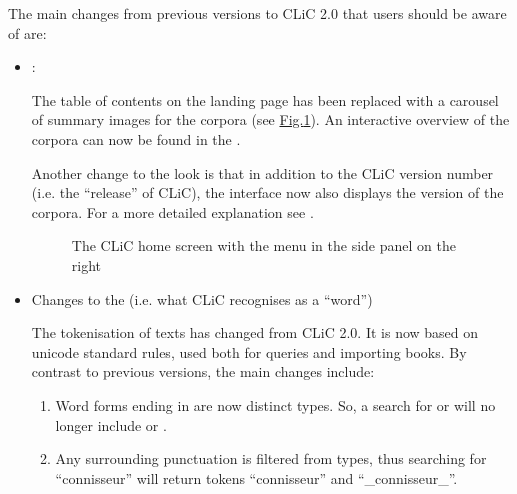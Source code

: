 \documentclass[letterpaper,10pt,english]{sphinxmanual}
\begin{document}
\sphinxAtStartPar
The main changes from previous versions to CLiC 2.0 that users should be
aware of are:
\begin{itemize}
\item {} 
\sphinxAtStartPar
{}:

\sphinxAtStartPar
The table of contents on the landing page has been replaced with a
carousel of summary images for the corpora (see
\hyperref[\detokenize{whatsnew:figure-landing-page-2-0-0-19c}]{Fig.\@ \ref{\detokenize{whatsnew:figure-landing-page-2-0-0-19c}}}). An interactive overview of
the corpora can now be found in the .

\sphinxAtStartPar
Another change to the look is that in addition to the CLiC version
number (i.e. the “release” of CLiC), the interface now also displays
the version of the corpora. For a more detailed explanation see
{\hyperref[\detokenize{cliccorpora:the-clic-corpora}]{}}.

\begin{figure}[htbp]
\centering
\capstart

\noindent{}
\caption{The CLiC home screen with the menu in the side panel on
the right}\label{\detokenize{whatsnew:id2}}\label{\detokenize{whatsnew:figure-landing-page-2-0-0-19c}}\end{figure}

\item {} 
\sphinxAtStartPar
Changes to the  (i.e. what CLiC recognises as a
“word”)

\sphinxAtStartPar
The tokenisation of texts has changed from CLiC 2.0. It is now based
on unicode standard rules, used both for queries and importing books.
By contrast to previous versions, the main changes include:
\begin{enumerate}
%
\item {} 
\sphinxAtStartPar
Word forms ending in  are now distinct types. So, a search for
 or  will no longer include  or
.

\item {} 
\sphinxAtStartPar
Any surrounding punctuation is filtered from types, thus searching
for “connisseur” will return tokens “connisseur” and
“\_connisseur\_”.


\end{enumerate}
\end{itemize}
\end{document}
